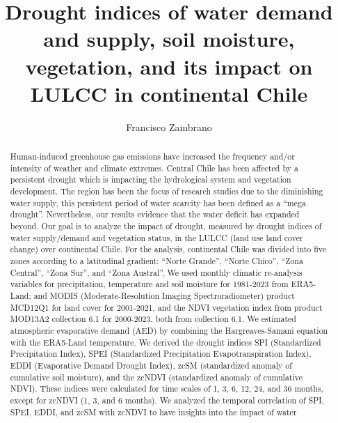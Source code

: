 \documentclass[
  number,
  preprint,
  3p,
  onecolumn]{elsarticle}
\begin{document}
\begin{frontmatter}
\title{Drought indices of water demand and supply, soil moisture,
vegetation, and its impact on LULCC in continental Chile}
\author[1]{Francisco Zambrano%
%
}


        
\begin{abstract}
Human-induced greenhouse gas emissions have increased the frequency
and/or intensity of weather and climate extremes. Central Chile has been
affected by a persistent drought which is impacting the hydrological
system and vegetation development. The region has been the focus of
research studies due to the diminishing water supply, this persistent
period of water scarcity has been defined as a ``mega drought''.
Nevertheless, our results evidence that the water deficit has expanded
beyond. Our goal is to analyze the impact of drought, measured by
drought indices of water supply/demand and vegetation status, in the
LULCC (land use land cover change) over continental Chile. For the
analysis, continental Chile was divided into five zones according to a
latitudinal gradient: ``Norte Grande'', ``Norte Chico'', ``Zona
Central'', ``Zona Sur'', and ``Zona Austral''. We used monthly climatic
re-analysis variables for precipitation, temperature and soil moisture
for 1981-2023 from ERA5-Land; and MODIS (Moderate-Resolution Imaging
Spectroradiometer) product MCD12Q1 for land cover for 2001-2021, and the
NDVI vegetation index from product MOD13A2 collection 6.1 for 2000-2023,
both from collection 6.1. We estimated atmospheric evaporative demand
(AED) by combining the Hargreaves-Samani equation with the ERA5-Land
temperature. We derived the drought indices SPI (Standardized
Precipitation Index), SPEI (Standardized Precipitation
Evapotranspiration Index), EDDI (Evaporative Demand Drought Index), zcSM
(standardized anomaly of cumulative soil moisture), and the zcNDVI
(standardized anomaly of cumulative NDVI). These indices were calculated
for time scales of 1, 3, 6, 12, 24, and 36 months, except for zcNDVI (1,
3, and 6 months). We analyzed the temporal correlation of SPI, SPEI,
EDDI, and zcSM with zcNDVI to have insights into the impact of water

\end{abstract}
\end{frontmatter}
\end{document}
